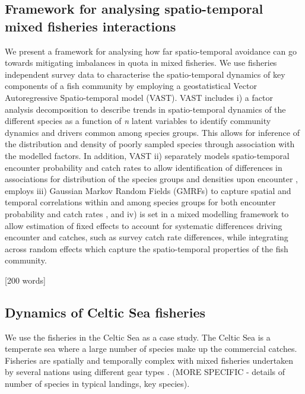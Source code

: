 \documentclass{nature}
\begin{document}
\begin{linenumbers}
[589 words]

\subsection{Framework for analysing spatio-temporal mixed fisheries
	interactions}

We present a framework for analysing how far spatio-temporal avoidance can go
towards mitigating imbalances in quota in mixed fisheries. We use fisheries
independent survey data to characterise the spatio-temporal dynamics of key
components of a fish community by employing a geostatistical Vector
Autoregressive Spatio-temporal model (VAST). VAST includes i) a factor analysis
decomposition to describe trends in spatio-temporal dynamics of the different
species as a function of \textit{n} latent variables\cite{Thorson2015} to
identify community dynamics and drivers common among species groups. This
allows for inference of the distribution and density of poorly sampled species
through association with the modelled factors. In addition, VAST ii) separately
models spatio-temporal encounter probability and catch rates to allow
identification of differences in associations for distribution of the species
groups and densities upon encounter \cite{Thorson2015a}, employs iii) Gaussian
Markov Random Fields (GMRFs) to capture spatial and temporal correlations
within and among species groups for both encounter probability and catch rates
\cite{Thorson2013}, and iv) is set in a mixed modelling framework to allow
estimation of fixed effects to account for systematic differences driving
encounter and catches, such as survey catch rate differences, while integrating
across random effects which capture the spatio-temporal properties of the fish
community.

[200 words]

\subsection{Dynamics of Celtic Sea fisheries}

We use the fisheries in the Celtic Sea as a case study. The Celtic Sea is a
temperate sea where a large number of species make up the commercial catches.
Fisheries are spatially and temporally complex with mixed fisheries undertaken
by several nations using different gear types \cite{Ellis2000, Gerritsen2012}.
(MORE SPECIFIC - details of number of species in typical landings, key
species).


\end{linenumbers}
\end{document}
